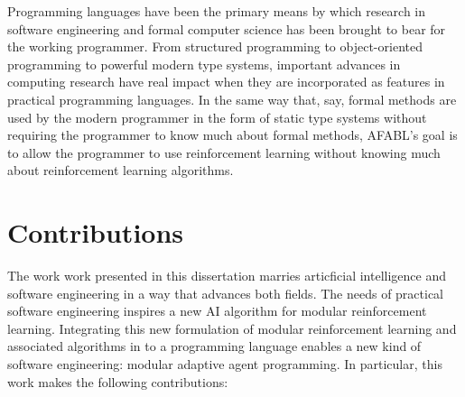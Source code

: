 Programming languages have been the primary means by which research in software engineering and formal computer science has been brought to bear for the working programmer. From structured programming to object-oriented programming to powerful modern type systems, important advances in computing research have real impact when they are incorporated as features in practical programming languages. In the same way that, say, formal methods are used by the modern programmer in the form of static type systems without requiring the programmer to know much about formal methods, AFABL's goal is to allow the programmer to use reinforcement learning without knowing much about reinforcement learning algorithms.

\section{Contributions}

The work work presented in this dissertation marries articficial intelligence and software engineering in a way that advances both fields. The needs of practical software engineering inspires a new AI algorithm for modular reinforcement learning. Integrating this new formulation of modular reinforcement learning and associated algorithms in to a programming language enables a new kind of software engineering: modular adaptive agent programming. In particular, this work makes the following contributions:

